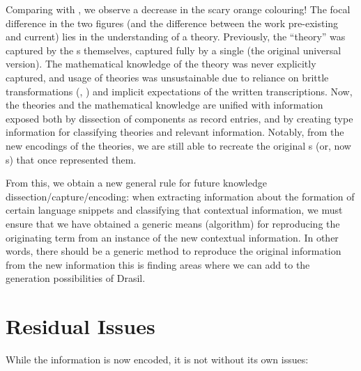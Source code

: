 Comparing  with , we
observe a decrease in the scary orange colouring! The focal difference in the
two figures (and the difference between the work pre-existing and current) lies
in the understanding of a theory. Previously, the ``theory'' was captured by the
\RelationConcept{}s themselves, captured fully by a single \Expr{} (the original
universal version). The mathematical knowledge of the theory was never
explicitly captured, and usage of theories was unsustainable due to reliance on
brittle transformations (\relToQD{}, ) and implicit
expectations of the written transcriptions. Now, the theories and the
mathematical knowledge are unified with information exposed both by dissection
of components as record entries, and by creating type information for
classifying theories and relevant information. Notably, from the new encodings
of the theories, we are still able to recreate the original \Expr{}s (or, now
\ModelExpr{}s) that once represented them.



From this, we obtain a new general rule for future knowledge
dissection/capture/encoding: when extracting information about the formation of
certain language snippets and classifying that contextual information, we must
ensure that we have obtained a generic means (algorithm) for reproducing the
originating term from an instance of the new contextual information. In other
words, there should be a generic method to reproduce the original information
from the new information \textemdash{} this is finding areas where we can add to the
generation possibilities of Drasil.


\section{Residual Issues}

While the information is now encoded, it is not without its own issues:

